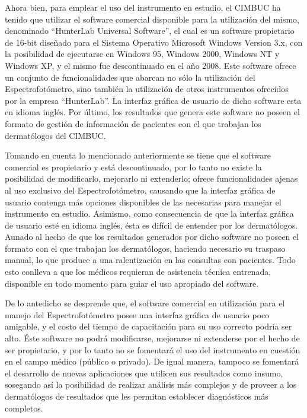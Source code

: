 Ahora bien, para emplear el uso del instrumento en estudio, el CIMBUC ha tenido que utilizar el software comercial disponible para la utilizaci\'{o}n del mismo, denominado ``HunterLab Universal Software'', el cual es un software propietario de 16-bit dise\~{n}ado para el Sistema Operativo Microsoft Windows Version 3.x, con la posibilidad de ejecutarse en Windows 95, Windows 2000, Windows NT y Windows XP, y el mismo fue descontinuado en el a\~{n}o 2008. Este software ofrece un conjunto de funcionalidades que abarcan no s\'{o}lo la utilizaci\'{o}n del Espectrofot\'{o}metro, sino tambi\'{e}n la utilizaci\'{o}n de otros instrumentos ofrecidos por la empresa ``HunterLab''. La interfaz gr\'{a}fica de usuario de dicho software esta en idioma ingl\'{e}s. Por \'{u}ltimo, los resultados que genera este software no poseen el formato de gesti\'{o}n de informaci\'{o}n de pacientes con el que trabajan los dermat\'{o}logos del CIMBUC.

Tomando en cuenta lo mencionado anteriormente se tiene que el software comercial es propietario y est\'{a} descontinuado, por lo tanto no existe la posibilidad de modificarlo, mejorarlo ni extenderlo; ofrece funcionalidades ajenas al uso exclusivo del Espectrofot\'{o}metro, causando que la interfaz gr\'{a}fica de usuario contenga m\'{a}s opciones disponibles de las necesarias para manejar el instrumento en estudio. Asimismo, como consecuencia de que la interfaz gr\'{a}fica de usuario est\'{e} en idioma ingl\'{e}s, \'{e}sta es dif\'{i}cil de entender por los dermat\'{o}logos. Aunado al hecho de que los resultados generados por dicho software no poseen el formato con el que trabajan los dermat\'{o}logos, haciendo necesario su traspaso manual, lo que produce a una ralentizaci\'{o}n en las consultas con pacientes. Todo esto conlleva a que los m\'{e}dicos requieran de asistencia t\'{e}cnica entrenada, disponible en todo momento para guiar el uso apropiado del software.

De lo antedicho se desprende que, el software comercial en utilizaci\'{o}n para el manejo del Espectrofot\'{o}metro posee una interfaz gr\'{a}fica de usuario poco amigable, y el costo del tiempo de capacitaci\'{o}n para su uso correcto podr\'{i}a ser alto. \'{E}ste software no podr\'{a} modificarse, mejorarse ni extenderse por el hecho de ser propietario, y por lo tanto no se fomentar\'{a} el uso del instrumento en cuesti\'{o}n en el campo m\'{e}dico (p\'{u}blico o privado). De igual manera, tampoco se fomentar\'{a} el desarrollo de nuevas aplicaciones que utilicen sus resultados como insumo, sosegando as\'{i} la posibilidad de realizar an\'{a}lisis m\'{a}s complejos y de proveer a los dermat\'{o}logos de resultados que les permitan establecer diagn\'{o}sticos m\'{a}s completos.

